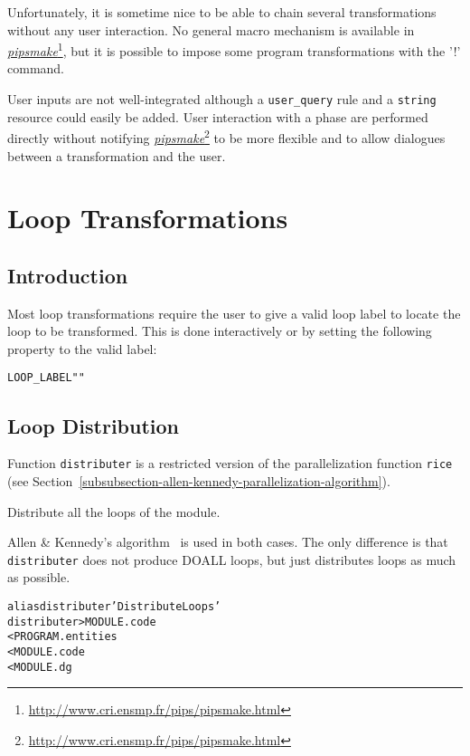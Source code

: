 \documentclass[a4paper]{report}
\newenvironment{PipsProp}{\begin{alltt}}{\end{alltt}}
\newenvironment{PipsMake}{\begin{alltt}}{\end{alltt}}
\newcommand{\LINK}[2]{\href{#2}{#1}\footnote{\url{#2}}\xspace}
\newcommand{\PIPSMAKE}{\LINK{\emph{pipsmake}}{http://www.cri.ensmp.fr/pips/pipsmake.html}\xspace}
\begin{document}
Unfortunately, it is sometime nice to be able to chain several
transformations without any user interaction. No general macro mechanism is
available in \PIPSMAKE, but it is possible to impose some program
transformations with the '!' command.

User inputs are not well-integrated although a \verb+user_query+ rule
and a \verb+string+ resource could easily be added. User interaction
with a phase are performed directly without notifying \PIPSMAKE{} to be
more flexible and to allow dialogues between a transformation and the user.



\section{Loop Transformations}

\subsection{Introduction}

Most loop transformations require the user to give a valid loop label to locate the loop to be transformed.
This is done interactively or by setting the following property to the valid label:
\begin{PipsProp}
LOOP_LABEL ""
\end{PipsProp}

\subsection{Loop Distribution}
\label{subsection-loop-distribution}

Function \verb+distributer+ is a restricted version of the
parallelization function \verb+rice+ (see
Section~\ref{subsubsection-allen-kennedy-parallelization-algorithm}).

Distribute all the loops of the module.

Allen \& Kennedy's algorithm~\cite{AK87} is used in both cases. The only
difference is that \verb+distributer+ does not produce DOALL loops,
but just distributes loops as much as possible.

\begin{PipsMake}
alias distributer 'Distribute Loops'
distributer                    > MODULE.code
        < PROGRAM.entities
        < MODULE.code
        < MODULE.dg
\end{PipsMake}
\end{document}

